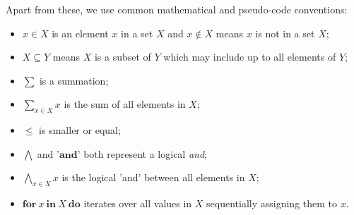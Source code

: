\documentclass[9pt]{article}   	%
\begin{document}
Apart from these, we use common mathematical and pseudo-code conventions: 
\begin{itemize}
	\item $x \in X$ is an element $x$ in a set $X$ and $x \notin X$ means $x$ is not in a set $X$;
	\item $X \subseteq Y$ means $X$ is a subset of $Y$ which may include up to all elements of $Y$;
	 \item $\sum$ is a summation;
	 \item $\sum\limits_{x \in X} x$ is the sum of all elements in $X$;
	 \item $\leq$ is smaller or equal;
	 \item $\bigwedge$ and '$\textbf{and}$' both represent a logical \textit{and};
	 \item $\bigwedge\limits_{x \in X} x$ is the logical 'and' between all elements in $X$;
	 \item $\textbf{for}~x ~\textbf{in}~ X~\textbf{do}$ iterates over all values in $X$ sequentially assigning them to $x$.
\end{itemize}
\end{document}
